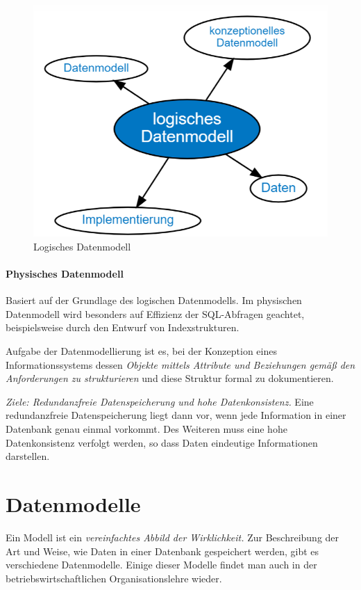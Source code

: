  \begin{figure}[h]
    \centering
    \includegraphics[width=.75\textwidth]{Content/images/modellierung/logisch.png}
    \caption{Logisches Datenmodell}
    \label{fig:modellierung:logisch}
 \end{figure}

 \paragraph{Physisches Datenmodell}
Basiert auf der Grundlage des logischen Datenmodells. Im physischen Datenmodell wird besonders auf Effizienz der SQL-Abfragen geachtet, beispielsweise durch den Entwurf von Indexstrukturen.

Aufgabe der Datenmodellierung ist es, bei der Konzeption eines Informationssystems dessen \emph{Objekte mittels Attribute und Beziehungen gemäß den Anforderungen zu strukturieren} und diese Struktur formal zu dokumentieren.

\emph{Ziele: Redundanzfreie Datenspeicherung und hohe Datenkonsistenz.}
Eine redundanzfreie Datenspeicherung liegt dann vor, wenn jede Information in einer Datenbank genau einmal vorkommt. Des Weiteren muss eine hohe Datenkonsistenz verfolgt werden, so dass Daten eindeutige Informationen darstellen.

\section{Datenmodelle}

Ein Modell ist ein \emph{vereinfachtes Abbild der Wirklichkeit.} Zur Beschreibung der Art und Weise, wie Daten in einer Datenbank gespeichert werden, gibt es verschiedene Datenmodelle. Einige dieser Modelle findet man auch in der betriebswirtschaftlichen Organisationslehre wieder.

